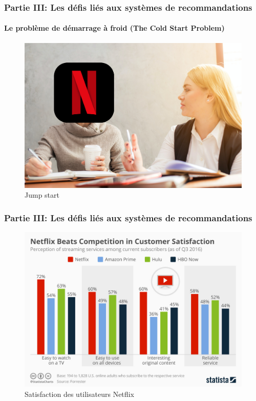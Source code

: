 \begin{frame}

    \frametitle{Partie III: Les défis liés aux systèmes de recommandations}
    \framesubtitle{Le problème de démarrage à froid (The Cold Start Problem)}

    \begin{figure}
        \centering
        \includegraphics[totalheight=5.5cm]{Images/PartieIII/NetflixAsking.png}
        \caption{Jump start}
    \end{figure}

\end{frame}

\begin{frame}

    \frametitle{Partie III: Les défis liés aux systèmes de recommandations}

    \begin{figure}
        \centering
        \includegraphics[totalheight=5.5cm]{Images/PartieIII/NetflixCustomerSatisfaction.jpeg}
        \caption{Satisfaction des utilisateurs Netflix}
    \end{figure}

\end{frame}

